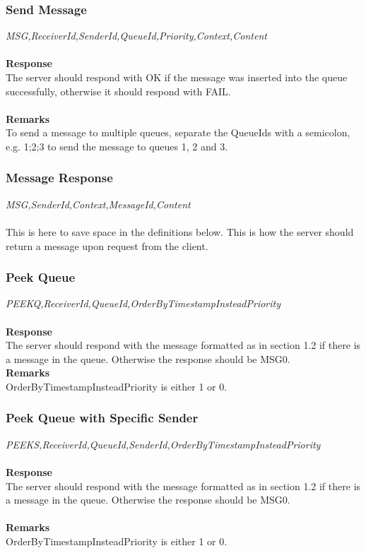 \documentclass{article}
\begin{document}
            \subsubsection{Send Message}
                \indent\indent\textit{MSG,ReceiverId,SenderId,QueueId,Priority,Context,Content}\\
                \\
                \textbf{Response}\\
                The server should respond with OK if the message was inserted into the queue successfully, otherwise it should respond with FAIL.\\
                \\
                \textbf{Remarks}\\
                To send a message to multiple queues, separate the QueueIds with a semicolon, e.g. 1;2;3 to send the message to queues 1, 2 and 3.

            \subsubsection{Message Response}
                \indent\indent\textit{MSG,SenderId,Context,MessageId,Content}\\
                \\
                This is here to save space in the definitions below. This is how the server should return a message upon request from the client.

            \subsubsection{Peek Queue}
                \indent\indent \textit{PEEKQ,ReceiverId,QueueId,OrderByTimestampInsteadPriority}\\
                \\
                \textbf{Response}\\
                The server should respond with the message formatted as in section 1.2 if there is a message in the queue. Otherwise the response should be MSG0.\\
                \textbf{Remarks}\\
                OrderByTimestampInsteadPriority is either 1 or 0.

            \subsubsection{Peek Queue with Specific Sender}
                \indent\indent\textit{PEEKS,ReceiverId,QueueId,SenderId,OrderByTimestampInsteadPriority}\\
            \\
            \textbf{Response}\\
            The server should respond with the message formatted as in section 1.2 if there is a message in the queue. Otherwise the response should be MSG0.\\
            \\
            \textbf{Remarks}\\
            OrderByTimestampInsteadPriority is either 1 or 0.
\end{document}
